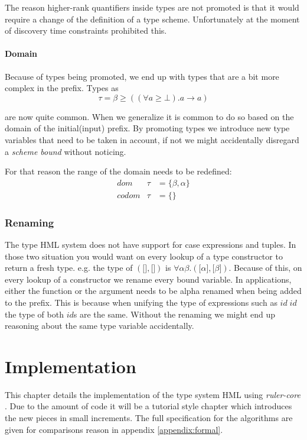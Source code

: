 \documentclass[twoside, titlepage, openright, a4paper]{book}
\newcommand{\Varid}[1]{\mathit{#1}}
\renewcommand{\geq}{\geqslant}
\newcommand{\rcore}{\emph{ruler-core }}
\begin{document}
The reason higher-rank quantifiers inside types are not promoted is that it would require a change of the definition of a type scheme. Unfortunately at the moment of discovery time constraints prohibited this.
\subsubsection{Domain}
Because of types being promoted, we end up with types that are a bit more complex in the prefix. Types as 
\begin{equation}
\tau = \beta \geq ((\forall a \geq \bot). a \rightarrow a)
\end{equation}

are now quite common. When we generalize it is common to do so based on the domain of the initial(input) prefix. By promoting types we introduce new type variables that need to be taken in account, if not we might accidentally disregard a \emph{scheme bound} without noticing. 

For that reason the range of the domain needs to be redefined:
\begin{eqnarray*}
dom   &\tau& = \{\beta, \alpha\}\\
codom &\tau& = \{\}
\end{eqnarray*}

\subsection{Renaming}
\label{renaming}

The type HML system does not have support for case expressions and tuples. In those two situation you would want on every lookup of a type constructor to return a fresh type. e.g. the type of $(\lbrack \rbrack, \lbrack \rbrack)$ is $\forall \alpha \beta . (\lbrack \alpha \rbrack, \lbrack \beta \rbrack)$. Because of this, on every lookup of a constructor we rename every bound variable. In applications, either the function or the argument needs to be alpha renamed when being added to the prefix. This is because when unifying the type of expressions such as \ensuremath{\Varid{id}\;\Varid{id}} the type of both \ensuremath{\Varid{id}}s are the same. Without the renaming we might end up reasoning about the same type variable accidentally.

\chapter{Implementation}
\label{Implementation}
This chapter details the implementation of the type system HML using \rcore. Due to the amount of code it will be a tutorial style chapter which introduces the new pieces in small increments. The full specification for the algorithms are given for comparisons reason in appendix \ref{appendix:formal}.
\end{document}
